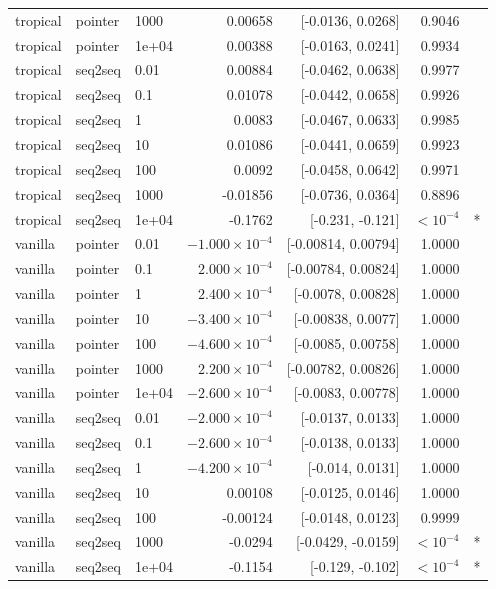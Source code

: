 \documentclass[10pt]{article}
\begin{document}
{\begin{longtable}{lllrrrl}
tropical & pointer & 1000 & 0.00658 & [-0.0136, 0.0268] & 0.9046 & \\
tropical & pointer & 1e+04 & 0.00388 & [-0.0163, 0.0241] & 0.9934 & \\
tropical & seq2seq & 0.01 & 0.00884 & [-0.0462, 0.0638] & 0.9977 & \\
tropical & seq2seq & 0.1 & 0.01078 & [-0.0442, 0.0658] & 0.9926 & \\
tropical & seq2seq & 1 & 0.0083 & [-0.0467, 0.0633] & 0.9985 & \\
tropical & seq2seq & 10 & 0.01086 & [-0.0441, 0.0659] & 0.9923 & \\
tropical & seq2seq & 100 & 0.0092 & [-0.0458, 0.0642] & 0.9971 & \\
tropical & seq2seq & 1000 & -0.01856 & [-0.0736, 0.0364] & 0.8896 & \\
tropical & seq2seq & 1e+04 & -0.1762 & [-0.231, -0.121] & $<10^{-4}$ & *\\
vanilla & pointer & 0.01 & $-1.000\times10^{-4}$ & [-0.00814, 0.00794] & 1.0000 & \\
vanilla & pointer & 0.1 & $2.000\times10^{-4}$ & [-0.00784, 0.00824] & 1.0000 & \\
vanilla & pointer & 1 & $2.400\times10^{-4}$ & [-0.0078, 0.00828] & 1.0000 & \\
vanilla & pointer & 10 & $-3.400\times10^{-4}$ & [-0.00838, 0.0077] & 1.0000 & \\
vanilla & pointer & 100 & $-4.600\times10^{-4}$ & [-0.0085, 0.00758] & 1.0000 & \\
vanilla & pointer & 1000 & $2.200\times10^{-4}$ & [-0.00782, 0.00826] & 1.0000 & \\
vanilla & pointer & 1e+04 & $-2.600\times10^{-4}$ & [-0.0083, 0.00778] & 1.0000 & \\
vanilla & seq2seq & 0.01 & $-2.000\times10^{-4}$ & [-0.0137, 0.0133] & 1.0000 & \\
vanilla & seq2seq & 0.1 & $-2.600\times10^{-4}$ & [-0.0138, 0.0133] & 1.0000 & \\
vanilla & seq2seq & 1 & $-4.200\times10^{-4}$ & [-0.014, 0.0131] & 1.0000 & \\
vanilla & seq2seq & 10 & 0.00108 & [-0.0125, 0.0146] & 1.0000 & \\
vanilla & seq2seq & 100 & -0.00124 & [-0.0148, 0.0123] & 0.9999 & \\
vanilla & seq2seq & 1000 & -0.0294 & [-0.0429, -0.0159] & $<10^{-4}$ & *\\
vanilla & seq2seq & 1e+04 & -0.1154 & [-0.129, -0.102] & $<10^{-4}$ & *\\
\bottomrule
\end{longtable}
}
\end{document}
